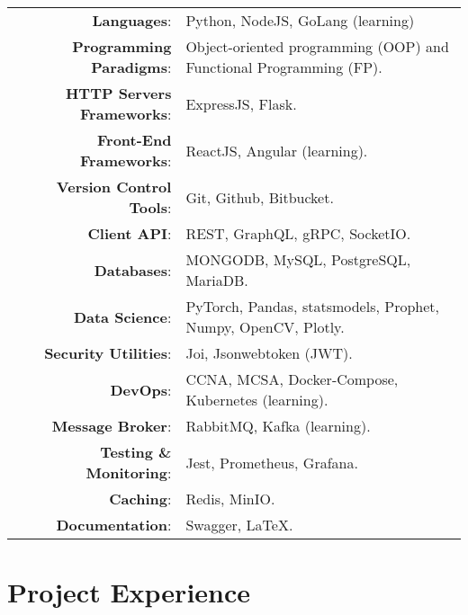 \documentclass[a4paper,10pt]{article}
\begin{document}
\begin{tabular}{rl}	
    \textbf{Languages}:& Python, NodeJS, GoLang (learning)\\
    \textbf{Programming Paradigms}:&  Object-oriented programming (OOP) and Functional Programming (FP).\\
    \textbf{HTTP Servers Frameworks}:& ExpressJS, Flask.\\
    \textbf{Front-End Frameworks}:& ReactJS, Angular (learning).\\
    \textbf{Version Control Tools}:& Git, Github, Bitbucket.\\
    \textbf{Client API}:& REST, GraphQL, gRPC, SocketIO.\\
    \textbf{Databases}:& MONGODB, MySQL, PostgreSQL, MariaDB.\\
    \textbf{Data Science}:& PyTorch, Pandas, statsmodels, Prophet, Numpy, OpenCV, Plotly.\\
    \textbf{Security Utilities}:& Joi, Jsonwebtoken (JWT).\\ 
    \textbf{DevOps}:& CCNA, MCSA, Docker-Compose, Kubernetes (learning).\\
    \textbf{Message Broker}:& RabbitMQ, Kafka (learning).\\
    \textbf{Testing \& Monitoring}:& Jest, Prometheus, Grafana.\\ 
    \textbf{Caching}:& Redis, MinIO.\\
    \textbf{Documentation}:& Swagger, \LaTeX.\\
\end{tabular}

 
\section{\textbf{Project Experience}}  
\end{document}
